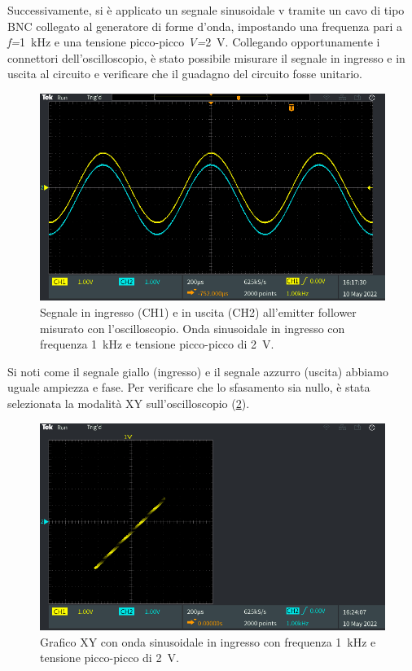 Successivamente, si è applicato un segnale sinusoidale v tramite un cavo di tipo BNC collegato al generatore di forme d'onda, impostando una frequenza pari a \textit{f=}\SI{1}{\kilo\hertz} e una tensione picco-picco \textit{V=}\SI{2}{\volt}. Collegando opportunamente i connettori dell'oscilloscopio, è stato possibile misurare il segnale in ingresso e in uscita al circuito e verificare che il guadagno del circuito fosse unitario.
\begin{figure}[h!]
	\centering
	\includegraphics[width=0.7\linewidth]{./ImageFiles/Laboratorio 1/TEK00005}
	\caption{Segnale in ingresso (CH1) e in uscita (CH2) all'emitter follower misurato con l'oscilloscopio. Onda sinusoidale in ingresso con frequenza \SI{1}{\kilo\hertz} e tensione picco-picco di \SI{2}{\volt}.}
	\label{fig:emitterfollwer_oscilloscopio_1}
\end{figure}
Si noti come il segnale giallo (ingresso) e il segnale azzurro (uscita) abbiamo uguale ampiezza e fase. Per verificare che lo sfasamento sia nullo, è stata selezionata la modalità XY sull'oscilloscopio (\Fig\ref{fig:emitterfollwer_XY_1}).
\begin{figure}[h!]
	\centering
	\includegraphics[width=0.7\linewidth]{./ImageFiles/Laboratorio 1/TEK00008}
	\caption{Grafico XY con onda sinusoidale in ingresso con frequenza \SI{1}{\kilo\hertz} e tensione picco-picco di \SI{2}{\volt}.}
	\label{fig:emitterfollwer_XY_1}
\end{figure}
